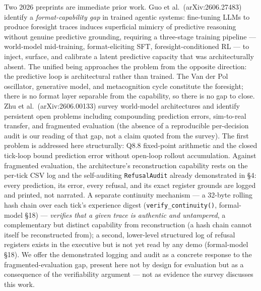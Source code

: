 \documentclass[
]{article}
\begin{document}
Two 2026 preprints are immediate prior work. Guo et
al.~(arXiv:2606.27483) identify a \emph{format-capability gap} in
trained agentic systems: fine-tuning LLMs to produce foresight traces
induces superficial mimicry of predictive reasoning without genuine
predictive grounding, requiring a three-stage training pipeline ---
world-model mid-training, format-eliciting SFT, foresight-conditioned RL
--- to inject, surface, and calibrate a latent predictive capacity that
was architecturally absent. The unified being approaches the problem
from the opposite direction: the predictive loop is architectural rather
than trained. The Van der Pol oscillator, generative model, and
metacognition cycle constitute the foresight; there is no format layer
separable from the capability, so there is no gap to close. Zhu et
al.~(arXiv:2606.00133) survey world-model architectures and identify
persistent open problems including compounding prediction errors,
sim-to-real transfer, and fragmented evaluation (the absence of a
reproducible per-decision audit is our reading of that gap, not a claim
quoted from the survey). The first problem is addressed here
structurally: Q8.8 fixed-point arithmetic and the closed tick-loop bound
prediction error without open-loop rollout accumulation. Against
fragmented evaluation, the architecture's reconstruction capability
rests on the per-tick CSV log and the self-auditing
\texttt{RefusalAudit} already demonstrated in §4: every prediction, its
error, every refusal, and its exact register grounds are logged and
printed, not narrated. A separate continuity mechanism --- a 32-byte
rolling hash chain over each tick's experience digest
(\texttt{verify\_continuity()}, formal-model §18) --- \emph{verifies
that a given trace is authentic and untampered}, a complementary but
distinct capability from reconstruction (a hash chain cannot itself be
reconstructed from); a second, lower-level structured log of refusal
registers exists in the executive but is not yet read by any demo
(formal-model §18). We offer the demonstrated logging and audit as a
concrete response to the fragmented-evaluation gap, present here not by
design for evaluation but as a consequence of the verifiability argument
--- not as evidence the survey discusses this work.
\end{document}
